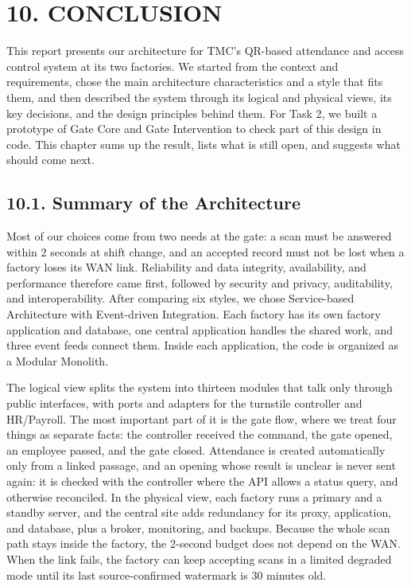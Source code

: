\section*{10. CONCLUSION}

{}

This report presents our architecture for TMC's QR-based attendance and access control system at its two factories. We started from the context and requirements, chose the main architecture characteristics and a style that fits them, and then described the system through its logical and physical views, its key decisions, and the design principles behind them. For Task 2, we built a prototype of Gate Core and Gate Intervention to check part of this design in code. This chapter sums up the result, lists what is still open, and suggests what should come next.

\subsection*{10.1. Summary of the Architecture}

{}

Most of our choices come from two needs at the gate: a scan must be answered within 2 seconds at shift change, and an accepted record must not be lost when a factory loses its WAN link. Reliability and data integrity, availability, and performance therefore came first, followed by security and privacy, auditability, and interoperability. After comparing six styles, we chose Service-based Architecture with Event-driven Integration. Each factory has its own factory application and database, one central application handles the shared work, and three event feeds connect them. Inside each application, the code is organized as a Modular Monolith.

The logical view splits the system into thirteen modules that talk only through public interfaces, with ports and adapters for the turnstile controller and HR/Payroll. The most important part of it is the gate flow, where we treat four things as separate facts: the controller received the command, the gate opened, an employee passed, and the gate closed. Attendance is created automatically only from a linked passage, and an opening whose result is unclear is never sent again: it is checked with the controller where the API allows a status query, and otherwise reconciled. In the physical view, each factory runs a primary and a standby server, and the central site adds redundancy for its proxy, application, and database, plus a broker, monitoring, and backups. Because the whole scan path stays inside the factory, the 2-second budget does not depend on the WAN. When the link fails, the factory can keep accepting scans in a limited degraded mode until its last source-confirmed watermark is 30 minutes old.

